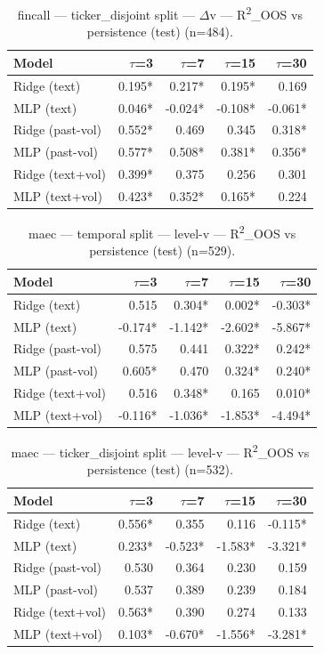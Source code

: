 \begin{table}[t]
\centering
\begin{tabular}{lrrrr}
\toprule
Model & $\tau$=3 & $\tau$=7 & $\tau$=15 & $\tau$=30 \\
\midrule
Ridge (text) & 0.195* & 0.217* & 0.195* & 0.169 \\
MLP (text) & 0.046* & -0.024* & -0.108* & -0.061* \\
Ridge (past-vol) & 0.552* & 0.469 & 0.345 & 0.318* \\
MLP (past-vol) & 0.577* & 0.508* & 0.381* & 0.356* \\
Ridge (text+vol) & 0.399* & 0.375 & 0.256 & 0.301 \\
MLP (text+vol) & 0.423* & 0.352* & 0.165* & 0.224 \\
\bottomrule
\end{tabular}
\caption{fincall — ticker\_disjoint split — $\Delta$v — R\textsuperscript{2}\_OOS vs persistence (test) (n=484).}
\end{table}

\begin{table}[t]
\centering
\begin{tabular}{lrrrr}
\toprule
Model & $\tau$=3 & $\tau$=7 & $\tau$=15 & $\tau$=30 \\
\midrule
Ridge (text) & 0.515 & 0.304* & 0.002* & -0.303* \\
MLP (text) & -0.174* & -1.142* & -2.602* & -5.867* \\
Ridge (past-vol) & 0.575 & 0.441 & 0.322* & 0.242* \\
MLP (past-vol) & 0.605* & 0.470 & 0.324* & 0.240* \\
Ridge (text+vol) & 0.516 & 0.348* & 0.165 & 0.010* \\
MLP (text+vol) & -0.116* & -1.036* & -1.853* & -4.494* \\
\bottomrule
\end{tabular}
\caption{maec — temporal split — level-v — R\textsuperscript{2}\_OOS vs persistence (test) (n=529).}
\end{table}

\begin{table}[t]
\centering
\begin{tabular}{lrrrr}
\toprule
Model & $\tau$=3 & $\tau$=7 & $\tau$=15 & $\tau$=30 \\
\midrule
Ridge (text) & 0.556* & 0.355 & 0.116 & -0.115* \\
MLP (text) & 0.233* & -0.523* & -1.583* & -3.321* \\
Ridge (past-vol) & 0.530 & 0.364 & 0.230 & 0.159 \\
MLP (past-vol) & 0.537 & 0.389 & 0.239 & 0.184 \\
Ridge (text+vol) & 0.563* & 0.390 & 0.274 & 0.133 \\
MLP (text+vol) & 0.103* & -0.670* & -1.556* & -3.281* \\
\bottomrule
\end{tabular}
\caption{maec — ticker\_disjoint split — level-v — R\textsuperscript{2}\_OOS vs persistence (test) (n=532).}
\end{table}

